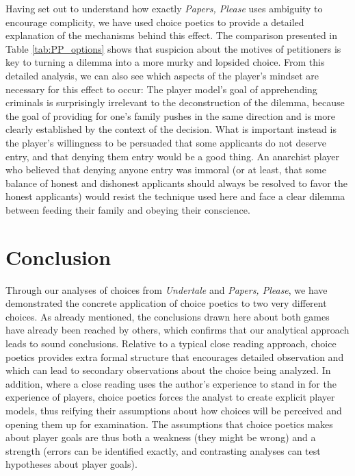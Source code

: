 \documentclass[arts,article,submit,moreauthors,pdftex,10pt,a4paper]{Definitions/mdpi}
\begin{document}
Having set out to understand how exactly \emph{Papers, Please} uses ambiguity to encourage complicity, we have used choice poetics to provide a detailed explanation of the mechanisms behind this effect.
%
The comparison presented in Table \ref{tab:PP_options} shows that suspicion about the motives of petitioners is key to turning a dilemma into a more murky and lopsided choice.
%
From this detailed analysis, we can also see which aspects of the player's mindset are necessary for this effect to occur: The player model's goal of apprehending criminals is surprisingly irrelevant to the deconstruction of the dilemma, because the goal of providing for one's family pushes in the same direction and is more clearly established by the context of the decision.
%
What is important instead is the player's willingness to be persuaded that some applicants do not deserve entry, and that denying them entry would be a good thing.
%
An anarchist player who believed that denying anyone entry was immoral (or at least, that some balance of honest and dishonest applicants should always be resolved to favor the honest applicants) would resist the technique used here and face a clear dilemma between feeding their family and obeying their conscience.


\section{Conclusion}

Through our analyses of choices from \emph{Undertale} and \emph{Papers, Please}, we have demonstrated the concrete application of choice poetics to two very different choices.
%
As already mentioned, the conclusions drawn here about both games have already been reached by others, which confirms that our analytical approach leads to sound conclusions.
%
Relative to a typical close reading approach, choice poetics provides extra formal structure that encourages detailed observation and which can lead to secondary observations about the choice being analyzed.
%
In addition, where a close reading uses the author's experience to stand in for the experience of players, choice poetics forces the analyst to create explicit player models, thus reifying their assumptions about how choices will be perceived and opening them up for examination.
%
The assumptions that choice poetics makes about player goals are thus both a weakness (they might be wrong) and a strength (errors can be identified exactly, and contrasting analyses can test hypotheses about player goals).
\end{document}
